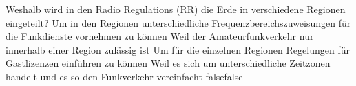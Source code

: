     {Weshalb wird in den Radio Regulations (RR) die Erde in verschiedene Regionen eingeteilt?}
    {Um in den Regionen unterschiedliche Frequenzbereichszuweisungen für die Funkdienste vornehmen zu können}
    {Weil der Amateurfunkverkehr nur innerhalb einer Region zulässig ist}
    {Um für die einzelnen Regionen Regelungen für Gastlizenzen einführen zu können}
    {Weil es sich um unterschiedliche Zeitzonen handelt und es so den Funkverkehr vereinfacht}
    {false}{false}